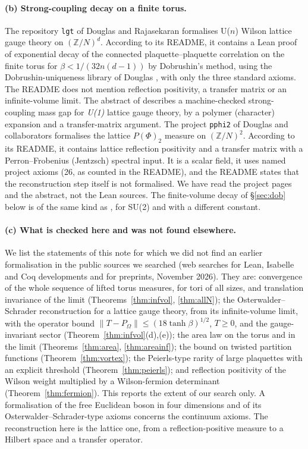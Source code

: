 \documentclass[11pt,a4paper]{article}
\theoremstyle{definition}
\theoremstyle{remark}
\newcommand{\Z}{\mathbb{Z}}
\begin{document}
\paragraph{(b) Strong-coupling decay on a finite torus.}
The repository \texttt{lgt} of Douglas and Rajasekaran \cite{LGT} formalises U($n$) Wilson lattice gauge theory on $(\Z/N)^d$. According to its README, it contains a Lean proof of exponential decay of the connected plaquette--plaquette correlation on the finite torus for $\beta<1/(32n(d-1))$ by Dobrushin's method, using the Dobrushin-uniqueness library of Douglas \cite{MSG}, with only the three standard axioms. The README does not mention reflection positivity, a transfer matrix or an infinite-volume limit. The abstract of \cite{Nov} describes a machine-checked strong-coupling mass gap for \emph{U(1)} lattice gauge theory, by a polymer (character) expansion and a transfer-matrix argument. The project \texttt{pphi2} of Douglas and collaborators \cite{PP2} formalises the lattice $P(\Phi)_2$ measure on $(\Z/N)^2$. According to its README, it contains lattice reflection positivity and a transfer matrix with a Perron--Frobenius (Jentzsch) spectral input. It is a scalar field, it uses named project axioms (26, as counted in the README), and the README states that the reconstruction step itself is not formalised. We have read the project pages and the abstract, not the Lean sources. The finite-volume decay of \S\ref{sec:dob} below is of the same kind as \cite{LGT}, for SU(2) and with a different constant.

\paragraph{(c) What is checked here and was not found elsewhere.}
We list the statements of this note for which we did not find an earlier formalisation in the public sources we searched (web searches for Lean, Isabelle and Coq developments and for preprints, November 2026). They are: convergence of the whole sequence of lifted torus measures, for tori of all sizes, and translation invariance of the limit (Theorems~\ref{thm:infvol}, \ref{thm:allN}); the Osterwalder--Schrader reconstruction for a lattice gauge theory, from its infinite-volume limit, with the operator bound $\|T-P_\Omega\|\le(18\tanh\beta)^{1/2}$, $T\ge0$, and the gauge-invariant sector (Theorem~\ref{thm:infvol}(d),(e)); the area law on the torus and in the limit (Theorems~\ref{thm:area}, \ref{thm:areainf}); the bound on twisted partition functions (Theorem~\ref{thm:vortex}); the Peierls-type rarity of large plaquettes with an explicit threshold (Theorem~\ref{thm:peierls}); and reflection positivity of the Wilson weight multiplied by a Wilson-fermion determinant (Theorem~\ref{thm:fermion}). This reports the extent of our search only. A formalisation of the free Euclidean boson in four dimensions and of its Osterwalder--Schrader-type axioms \cite{DHMN} concerns the continuum axioms. The reconstruction here is the lattice one, from a reflection-positive measure to a Hilbert space and a transfer operator.
\end{document}
